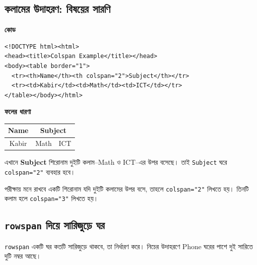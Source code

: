\subsection{কলামের উদাহরণ: বিষয়ের সারণি}

\par\noindent
\begin{minipage}[t]{.60\linewidth}\vspace{0pt}\small
\textbf{\color{chFourTeal}কোড}\par
\begin{verbatim}
<!DOCTYPE html><html>
<head><title>Colspan Example</title></head>
<body><table border="1">
  <tr><th>Name</th><th colspan="2">Subject</th></tr>
  <tr><td>Kabir</td><td>Math</td><td>ICT</td></tr>
</table></body></html>
\end{verbatim}
\par\smallskip
\end{minipage}\hfill
\begin{minipage}[t]{.36\linewidth}\vspace{0pt}\small
\textbf{\color{chFourTeal}ফলের ধারণা}\par
\begin{center}
\begin{tabular}{|c|c|c|}
\hline
\textbf{Name} & \multicolumn{2}{c|}{\textbf{Subject}} \\
\hline
Kabir & Math & ICT \\
\hline
\end{tabular}
\end{center}
এখানে \textbf{Subject} শিরোনাম দুইটি কলাম--Math ও ICT--এর উপর বসেছে। তাই \texttt{Subject} ঘরে \texttt{colspan="2"} ব্যবহার হবে।
\par\smallskip
\end{minipage}\par


\begin{boardbox}{পরীক্ষায় মনে রাখবে}
একটি শিরোনাম যদি দুইটি কলামের উপর বসে, তাহলে \texttt{colspan="2"} লিখতে হয়। তিনটি কলাম হলে \texttt{colspan="3"} লিখতে হয়।
\end{boardbox}

\subsection{\texttt{rowspan} দিয়ে সারিজুড়ে ঘর}

\texttt{rowspan} একটি ঘর কতটি সারিজুড়ে থাকবে, তা নির্ধারণ করে। নিচের উদাহরণে Phone ঘরের পাশে দুই সারিতে দুটি নম্বর আছে।

